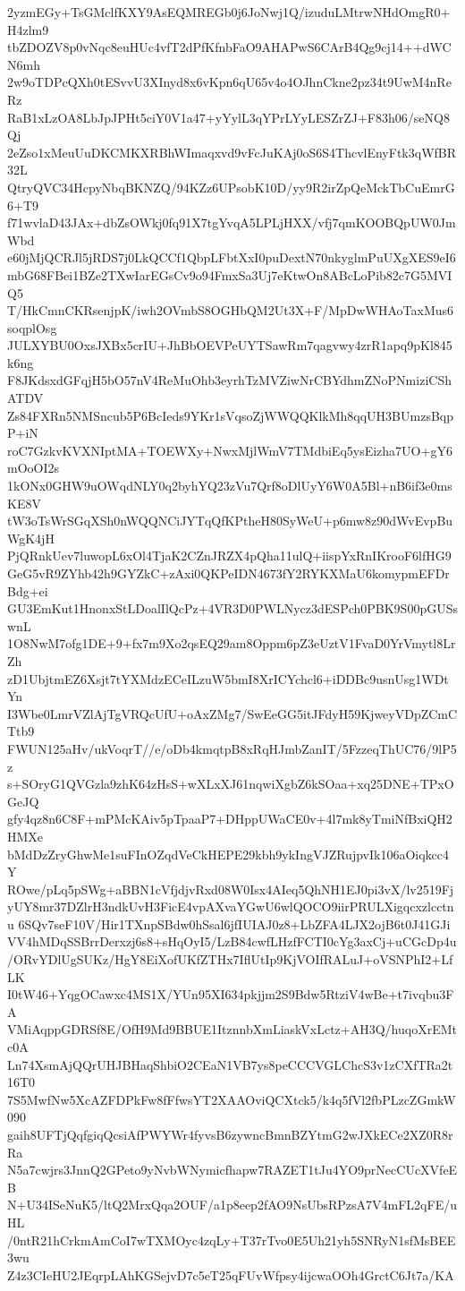 2yzmEGy+TsGMclfKXY9AsEQMREGb0j6JoNwj1Q/izuduLMtrwNHdOmgR0+H4zlm9
tbZDOZV8p0vNqc8euHUc4vfT2dPfKfnbFaO9AHAPwS6CArB4Qg9cj14++dWCN6mh
2w9oTDPcQXh0tESvvU3XInyd8x6vKpn6qU65v4o4OJhnCkne2pz34t9UwM4nReRz
RaB1xLzOA8LbJpJPHt5ciY0V1a47+yYylL3qYPrLYyLESZrZJ+F83h06/seNQ8Qj
2eZso1xMeuUuDKCMKXRBhWImaqxvd9vFcJuKAj0oS6S4ThcvlEnyFtk3qWfBR32L
QtryQVC34HcpyNbqBKNZQ/94KZz6UPsobK10D/yy9R2irZpQeMckTbCuEmrG6+T9
f71wvlaD43JAx+dbZsOWkj0fq91X7tgYvqA5LPLjHXX/vfj7qmKOOBQpUW0JmWbd
e60jMjQCRJl5jRDS7j0LkQCCf1QbpLFbtXxI0puDextN70nkyglmPuUXgXES9eI6
mbG68FBei1BZe2TXwIarEGsCv9o94FmxSa3Uj7eKtwOn8ABcLoPib82c7G5MVIQ5
T/HkCmnCKRsenjpK/iwh2OVmbS8OGHbQM2Ut3X+F/MpDwWHAoTaxMus6soqplOsg
JULXYBU0OxsJXBx5crIU+JhBbOEVPeUYTSawRm7qagvwy4zrR1apq9pKl845k6ng
F8JKdsxdGFqjH5bO57nV4ReMuOhb3eyrhTzMVZiwNrCBYdhmZNoPNmiziCShATDV
Zs84FXRn5NMSncub5P6BcIeds9YKr1sVqsoZjWWQQKlkMh8qqUH3BUmzsBqpP+iN
roC7GzkvKVXNIptMA+TOEWXy+NwxMjlWmV7TMdbiEq5ysEizha7UO+gY6mOoOI2s
1kONx0GHW9uOWqdNLY0q2byhYQ23zVu7Qrf8oDlUyY6W0A5Bl+nB6if3e0msKE8V
tW3oTsWrSGqXSh0nWQQNCiJYTqQfKPtheH80SyWeU+p6mw8z90dWvEvpBuWgK4jH
PjQRnkUev7luwopL6xOl4TjaK2CZnJRZX4pQha11ulQ+iispYxRnIKrooF6lfHG9
GeG5vR9ZYhb42h9GYZkC+zAxi0QKPeIDN4673fY2RYKXMaU6komypmEFDrBdg+ei
GU3EmKut1HnonxStLDoalIlQcPz+4VR3D0PWLNycz3dESPch0PBK9S00pGUSswnL
1O8NwM7ofg1DE+9+fx7m9Xo2qsEQ29am8Oppm6pZ3eUztV1FvaD0YrVmytl8LrZh
zD1UbjtmEZ6Xsjt7tYXMdzECeILzuW5bmI8XrICYchcl6+iDDBc9usnUsg1WDtYn
I3Wbe0LmrVZlAjTgVRQcUfU+oAxZMg7/SwEeGG5itJFdyH59KjweyVDpZCmCTtb9
FWUN125aHv/ukVoqrT//e/oDb4kmqtpB8xRqHJmbZanIT/5FzzeqThUC76/9lP5z
s+SOryG1QVGzla9zhK64zHsS+wXLxXJ61nqwiXgbZ6kSOaa+xq25DNE+TPxOGeJQ
gfy4qz8n6C8F+mPMcKAiv5pTpaaP7+DHppUWaCE0v+4l7mk8yTmiNfBxiQH2HMXe
bMdDzZryGhwMe1suFInOZqdVeCkHEPE29kbh9ykIngVJZRujpvIk106aOiqkcc4Y
ROwe/pLq5pSWg+aBBN1cVfjdjvRxd08W0Isx4AIeq5QhNH1EJ0pi3vX/lv2519Fj
yUY8mr37DZlrH3ndkUvH3FicE4vpAXvaYGwU6wlQOCO9iirPRULXigqcxzlcctnu
6SQv7seF10V/Hir1TXnpSBdw0hSsal6jfIUIAJ0z8+LbZFA4LJX2ojB6t0J41GJi
VV4hMDqSSBrrDerxzj6s8+sHqOyI5/LzB84cwfLHzfFCTI0cYg3axCj+uCGcDp4u
/ORvYDlUgSUKz/HgY8EiXofUKfZTHx7IflUtIp9KjVOIfRALuJ+oVSNPhI2+LfLK
I0tW46+YqgOCawxc4MS1X/YUn95XI634pkjjm2S9Bdw5RtziV4wBe+t7ivqbu3FA
VMiAqppGDRSf8E/OfH9Md9BBUE1ItznnbXmLiaskVxLctz+AH3Q/huqoXrEMtc0A
Ln74XsmAjQQrUHJBHaqShbiO2CEaN1VB7ys8peCCCVGLChcS3v1zCXfTRa2t16T0
7S5MwfNw5XcAZFDPkFw8fFfwsYT2XAAOviQCXtck5/k4q5fVl2fbPLzcZGmkW090
gaih8UFTjQqfgiqQcsiAfPWYWr4fyvsB6zywncBmnBZYtmG2wJXkECe2XZ0R8rRa
N5a7cwjrs3JnnQ2GPeto9yNvbWNymicfhapw7RAZET1tJu4YO9prNecCUcXVfeEB
N+U34ISeNuK5/ltQ2MrxQqa2OUF/a1p8eep2fAO9NsUbsRPzsA7V4mFL2qFE/uHL
/0ntR21hCrkmAmCoI7wTXMOyc4zqLy+T37rTvo0E5Uh21yh5SNRyN1sfMsBEE3wu
Z4z3CIeHU2JEqrpLAhKGSejvD7c5eT25qFUvWfpsy4ijcwaOOh4GrctC6Jt7a/KA
